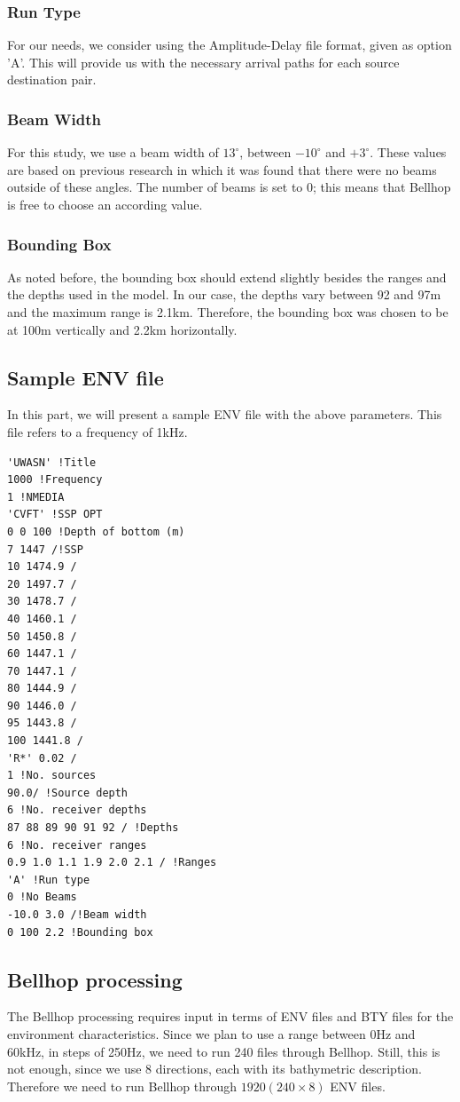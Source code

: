 \documentclass[a4paper]{IEEEtran}
\begin{document}
\subsubsection{Run Type}
For our needs, we consider using the Amplitude-Delay file format,
given as option 'A'. This will provide us with the necessary arrival
paths for each source destination pair.

\subsubsection{Beam Width}
For this study, we use a beam width of $13^{\circ}$, between
$-10^{\circ}$ and $+3^{\circ}$. These values are based on previous
research in which it was found that there were no beams outside of
these angles. The number of beams is set to 0; this means that Bellhop
is free to choose an according value.

\subsubsection{Bounding Box}
As noted before, the bounding box should extend slightly besides the
ranges and the depths used in the model. In our case, the depths vary
between 92 and 97m and the maximum range is 2.1km. Therefore, the
bounding box was chosen to be at 100m vertically and 2.2km horizontally.

\subsection{Sample ENV file}
In this part, we will present a sample ENV file with the above
parameters. This file refers to a frequency of 1kHz.

\begin{verbatim}
'UWASN' !Title
1000 !Frequency
1 !NMEDIA
'CVFT' !SSP OPT
0 0 100 !Depth of bottom (m)
7 1447 /!SSP
10 1474.9 /
20 1497.7 /
30 1478.7 /
40 1460.1 /
50 1450.8 /
60 1447.1 /
70 1447.1 /
80 1444.9 /
90 1446.0 /
95 1443.8 /
100 1441.8 /
'R*' 0.02 /
1 !No. sources
90.0/ !Source depth
6 !No. receiver depths
87 88 89 90 91 92 / !Depths
6 !No. receiver ranges
0.9 1.0 1.1 1.9 2.0 2.1 / !Ranges
'A' !Run type
0 !No Beams
-10.0 3.0 /!Beam width
0 100 2.2 !Bounding box
\end{verbatim}

\subsection{Bellhop processing}
\label{subsec:bellhop}
The Bellhop processing requires input in terms of ENV files and BTY
files for the environment characteristics. Since we plan to use a
range between 0Hz and 60kHz, in steps of 250Hz, we need to run 240
files through Bellhop. Still, this is not enough, since we use 8
directions, each with its bathymetric description. Therefore we need
to run Bellhop through $1920 (240 \times 8)$ ENV files.
\end{document}
